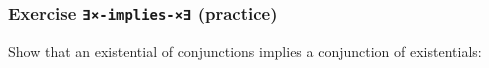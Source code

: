 \begin{fence}
\begin{code}%
\>[0]\<%
\\
\>[0][@{}l@{\AgdaIndent{0}}]%
\>[2]\AgdaSpace{}%
\AgdaSymbol{:}\AgdaSpace{}%
\AgdaSpace{}%
\AgdaSymbol{\{}\AgdaSpace{}%
\AgdaSymbol{:}\AgdaSpace{}%
\AgdaSymbol{\}}\AgdaSpace{}%
\AgdaSymbol{\{}\AgdaSpace{}%
\AgdaSpace{}%
\AgdaSymbol{:}\AgdaSpace{}%
\AgdaSpace{}%
\AgdaSpace{}%
\AgdaSymbol{\}}\AgdaSpace{}%
\<%
\\
\>[2][@{}l@{\AgdaIndent{0}}]%
\>[4]\AgdaFunction{∃[}\AgdaSpace{}%
\AgdaSpace{}%
\AgdaFunction{]}\AgdaSpace{}%
\AgdaSymbol{(}\AgdaSpace{}%
\AgdaSpace{}%
\AgdaSpace{}%
\AgdaSpace{}%
\AgdaSymbol{)}\AgdaSpace{}%
\AgdaSpace{}%
\AgdaSymbol{(}\AgdaFunction{∃[}\AgdaSpace{}%
\AgdaSpace{}%
\AgdaFunction{]}\AgdaSpace{}%
\AgdaSpace{}%
\AgdaSymbol{)}\AgdaSpace{}%
\AgdaSpace{}%
\AgdaSymbol{(}\AgdaFunction{∃[}\AgdaSpace{}%
\AgdaSpace{}%
\AgdaFunction{]}\AgdaSpace{}%
\AgdaSpace{}%
\AgdaSymbol{)}\<%
\end{code}
\end{fence}

\hypertarget{exercise--implies--practice-1}{%
\subsubsection{\texorpdfstring{Exercise \texttt{∃×-implies-×∃}
(practice)}{Exercise ∃×-implies-×∃ (practice)}}\label{exercise--implies--practice-1}}

Show that an existential of conjunctions implies a conjunction of
existentials:

